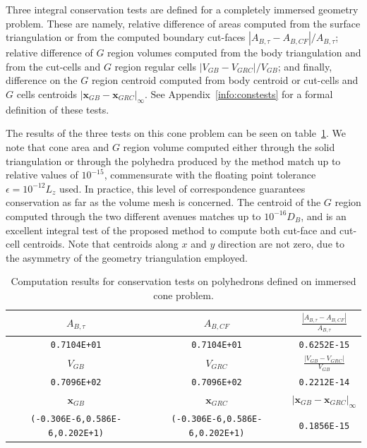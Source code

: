 \documentclass[11pt]{book}
\begin{document}
Three integral conservation tests are defined for a completely immersed geometry problem. These are namely, relative difference of areas computed from the surface triangulation or from the computed boundary cut-faces $|A_{B,\tau}-A_{B,CF}|/A_{B,\tau}$; relative difference of $G$ region volumes computed from the body triangulation and from the cut-cells and $G$ region regular cells $|V_{GB}-V_{GRC}|/V_{GB}$; and finally, difference on the $G$ region centroid computed from body centroid or cut-cells and $G$ cells centroids $|\mathbf{x}_{GB}-\mathbf{x}_{GRC}|_\infty$. See Appendix~\ref{info:constests} for a formal definition of these tests.

The results of the three tests on this cone problem can be seen on table~\ref{tab:cone_res}. We note that cone area and $G$ region volume computed either through the solid triangulation or through the polyhedra produced by the method match up to relative values of $10^{-15}$, commensurate with the floating point tolerance $\epsilon=10^{-12}L_z$ used. In practice, this level of correspondence guarantees conservation as far as the volume mesh is concerned. The centroid of the $G$ region computed through the two different avenues matches up to $10^{-16}D_B$, and is an excellent integral test of the proposed method to compute both cut-face and cut-cell centroids. Note that centroids along $x$ and $y$ direction are not zero, due to the asymmetry of the geometry triangulation employed.

%
\begin{table}[h]
  \begin{tabular}{c|c|c}
    \hline \hline
      $A_{B,\tau}$ & $A_{B,CF}$ & $\frac{|A_{B,\tau}-A_{B,CF} |}{A_{B,\tau}}$ \\ \hline
       \texttt{0.7104E+01} & \texttt{0.7104E+01} & \texttt{0.6252E-15} \\
    \hline \hline
      $V_{GB}$ & $V_{GRC}$ & $\frac{|V_{GB}-V_{GRC}|}{V_{GB}}$ \\  \hline
      \texttt{0.7096E+02} & \texttt{0.7096E+02} & \texttt{0.2212E-14} \\
    \hline \hline
    $\mathbf{x}_{GB}$ & $\mathbf{x}_{GRC}$ & $|\mathbf{x}_{GB}-\mathbf{x}_{GRC}|_\infty$ \\
    \hline \hline
    \texttt{(-0.306E-6,0.586E-6,0.202E+1)} &
    \texttt{(-0.306E-6,0.586E-6,0.202E+1)} &
    \texttt{0.1856E-15} \\
    \hline
  \end{tabular}
  \caption{Computation results for conservation tests on polyhedrons defined on immersed cone problem.}
  \label{tab:cone_res}
\end{table}
%
\end{document}
